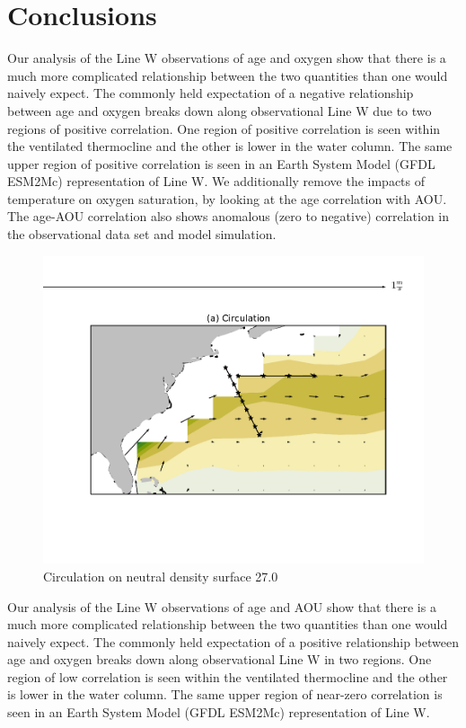 \section{Conclusions}
\label{section:conclusions}

Our analysis of the Line W observations of age and oxygen show that there is a
much more complicated relationship between the two quantities than one would naively
expect. The commonly held expectation of a negative relationship between age and
oxygen breaks down along observational Line W due to two regions of positive correlation.
One region of positive correlation is seen within the ventilated thermocline and
the other is lower in the water column. The same upper region of positive correlation
is seen in an Earth System Model (GFDL ESM2Mc) representation of Line W. We
additionally remove the impacts of temperature on oxygen saturation, by looking
at the age correlation with AOU. The age-AOU correlation also shows anomalous
(zero to negative) correlation in the observational data set and model simulation.

\begin{figure}
\centering
\includegraphics[width=\linewidth]{circulation.pdf}
\caption{Circulation on neutral density surface 27.0}
\label{fig:circulation}
\end{figure}

Our analysis of the Line W observations of age and AOU show that there is a much
more complicated relationship between the two quantities than one would naively
expect. The commonly held expectation of a positive relationship between age and
oxygen breaks down along observational Line W in two regions. One region of low
correlation is seen within the ventilated thermocline and the other is lower in
the water column. The same upper region of near-zero correlation is seen in an Earth
System Model (GFDL ESM2Mc) representation of Line W.

